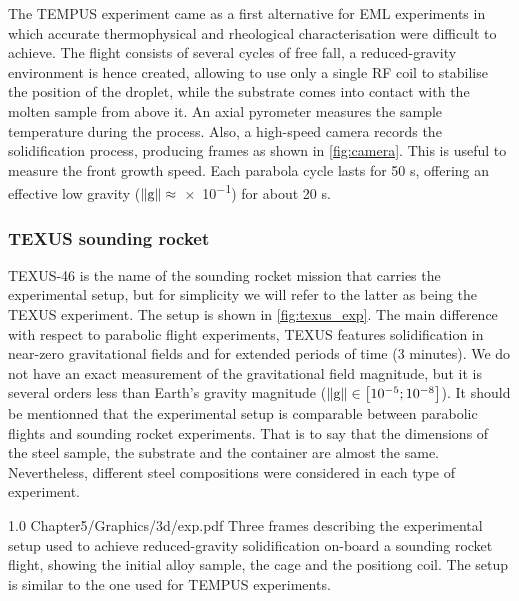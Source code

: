 The TEMPUS experiment came as a first alternative for EML experiments in which accurate thermophysical and rheological characterisation were difficult to achieve.
The flight consists of several cycles of free fall, a reduced-gravity environment is hence created, 
allowing to use only a single RF coil to stabilise the position of the droplet, while the substrate comes into contact with the molten sample
from above it. An axial pyrometer measures the sample temperature during the process. 
Also, a high-speed camera records the solidification process, producing frames as shown in \cref{fig:camera}.
This is useful to measure the front growth speed. 
Each parabola cycle lasts for 50 s, offering an effective low gravity ($\lVert \boldsymbol{\text{g}} \rVert\approx$\SI{e-1}{\uacceleration}) for about 20 s.

\subsubsection{TEXUS sounding rocket}

TEXUS-46 is the name of the sounding rocket mission that carries the experimental setup, 
but for simplicity we will refer to the latter as being the TEXUS experiment. The setup is shown in \cref{fig:texus_exp}.
The main difference with respect to parabolic flight experiments,
TEXUS features solidification in near-zero gravitational fields and for extended periods of time (3 minutes). 
We do not have an exact measurement of the gravitational field magnitude, but it is several orders
less than Earth's gravity magnitude ($\lVert \boldsymbol{\text{g}} \rVert \in \left[ 10^{-5};10^{-8} \right]$\si{\uacceleration}).
It should be mentionned that the experimental setup is comparable between parabolic flights and sounding rocket experiments. That is to say
that the dimensions of the steel sample, the substrate and the container are almost the same. Nevertheless, different steel compositions were
considered in each type of experiment.

\begin{figureth}
{1.0}
{Chapter5/Graphics/3d/exp.pdf}
{Three frames describing the experimental setup used to achieve reduced-gravity 
solidification on-board a sounding rocket flight,
showing the initial alloy sample, the cage and the positiong coil. The setup
is similar to the one used for TEMPUS experiments.}
\label{fig:texus_exp}
\end{figureth}

